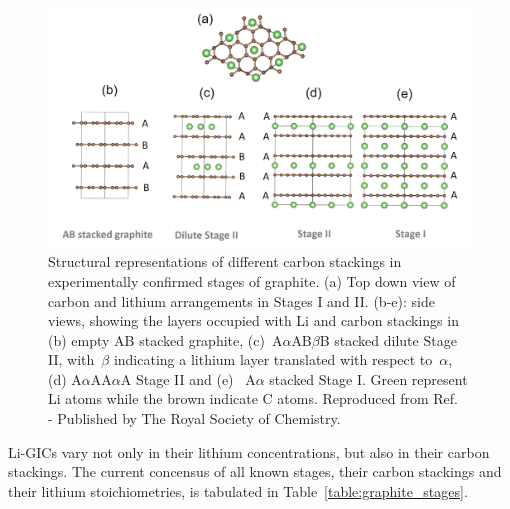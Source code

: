 \documentclass[../main.tex]{subfiles}
\begin{document}
\begin{figure}[h!]
    \begin{center}
    \includegraphics[width=0.98\columnwidth]{figures/stages_version4}
    \caption{Structural representations of different carbon stackings in experimentally confirmed stages of graphite. (a) Top down view of carbon and lithium arrangements in Stages I and II. (b-e): side views, showing
    the layers occupied with Li and carbon stackings in (b) empty AB stacked graphite, (c)~A\(\alpha\)AB\(\beta\)B stacked dilute Stage II, with~\(\beta\) indicating a lithium layer translated with respect to~\(\alpha\), (d)
    A\(\alpha\)AA\(\alpha\)A Stage II and (e)~ A\(\alpha\) stacked Stage I. Green represent Li atoms while
    the brown indicate C atoms. Reproduced from Ref.~ - Published by The Royal Society of Chemistry.}
    \label{fig:graphite_stages_schematics}
    \end{center}
\end{figure}

Li-GICs vary not only in their lithium concentrations, but also in their carbon stackings. The current concensus of all known stages, their carbon stackings and their lithium stoichiometries, is tabulated in Table~\ref{table:graphite_stages}.
\end{document}
